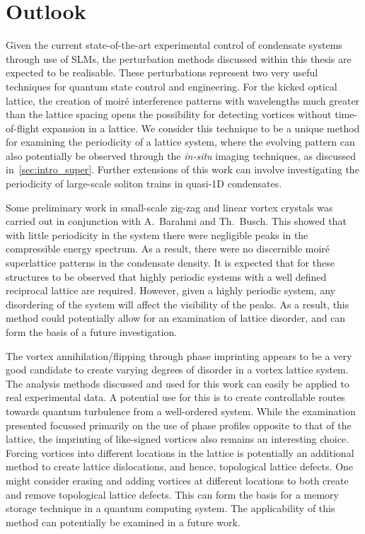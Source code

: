 \section{Outlook}
Given the current state-of-the-art experimental control of condensate systems through use of SLMs, the perturbation methods discussed within this thesis are expected to be realisable. These perturbations represent two very useful techniques for quantum state control and engineering. For the kicked optical lattice, the creation of moir\'e interference patterns with wavelengths much greater than the lattice spacing opens the possibility for detecting vortices without time-of-flight expansion in a lattice. We consider this technique to be a unique method for examining the periodicity of a lattice system, where the evolving pattern can also potentially be observed through the \textit{in-situ} imaging techniques, as discussed in~\ref{sec:intro_super}. Further extensions of this work can involve investigating the periodicity of large-scale soliton trains in quasi-1D condensates.

Some preliminary work in small-scale zig-zag and linear vortex crystals was carried out in conjunction with A.~Barahmi and Th.~Busch. This showed that with little periodicity in the system there were negligible peaks in the compressible energy spectrum. As a result, there were no discernible moir\'e superlattice patterns in the condensate density. It is expected that for these structures to be observed that highly periodic systems with a well defined reciprocal lattice are required. However, given a highly periodic system, any disordering of the system will affect the visibility of the peaks. As a result, this method could potentially allow for an examination of lattice disorder, and can form the basis of a future investigation.

The vortex annihilation/flipping through phase imprinting appears to be a very good candidate to create varying degrees of disorder in a vortex lattice system. The analysis methods discussed and used for this work can easily be applied to real experimental data. A potential use for this is to create controllable routes towards quantum turbulence from a well-ordered system. While the examination presented focussed primarily on the use of phase profiles opposite to that of the lattice, the imprinting of like-signed vortices also remains an interesting choice. Forcing vortices into different locations in the lattice is potentially an additional method to create lattice dislocations, and hence, topological lattice defects. One might consider erasing and adding vortices at different locations to both create and remove topological lattice defects. This can form the basis for a memory storage technique in a quantum computing system. The applicability of this method can potentially be examined in a future work.

